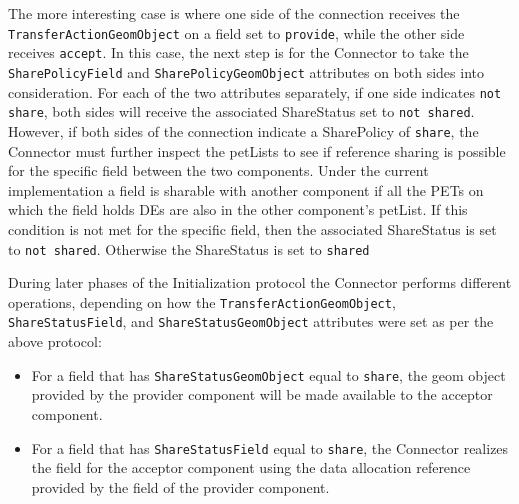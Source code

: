 The more interesting case is where one side of the connection receives the {\tt TransferActionGeomObject} on a field set to {\tt provide}, while the other side receives {\tt accept}. In this case, the next step is for the Connector to take the {\tt SharePolicyField} and {\tt SharePolicyGeomObject} attributes on both sides into consideration. For each of the two attributes separately, if one side indicates {\tt not share}, both sides will receive the associated ShareStatus set to {\tt not shared}. However, if both sides of the connection indicate a SharePolicy of {\tt share}, the Connector must further inspect the petLists to see if reference sharing is possible for the specific field between the two components. Under the current implementation a field is sharable with another component if all the PETs on which the field holds DEs are also in the other component's petList. If this condition is not met for the specific field, then the associated ShareStatus is set to {\tt not shared}. Otherwise the ShareStatus is set to {\tt shared}

During later phases of the Initialization protocol the Connector performs different operations, depending on how the {\tt TransferActionGeomObject}, {\tt ShareStatusField}, and {\tt ShareStatusGeomObject} attributes were set as per the above protocol:
\begin{itemize}
\item For a field that has {\tt ShareStatusGeomObject} equal to {\tt share}, the geom object provided by the provider component will be made available to the acceptor component.
\item For a field that has {\tt ShareStatusField} equal to {\tt share}, the Connector realizes the field for the acceptor component using the data allocation reference provided by the field of the provider component.
\end{itemize}

